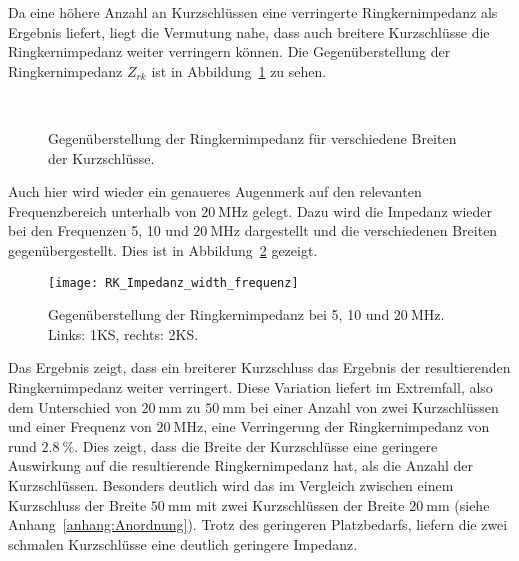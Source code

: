 \newpage



Da eine h\"ohere Anzahl an Kurzschl\"ussen eine verringerte Ringkernimpedanz als Ergebnis liefert, liegt die Vermutung nahe, dass auch breitere Kurzschl\"usse die Ringkernimpedanz weiter verringern k\"onnen. Die Gegen\"uberstellung der Ringkernimpedanz $Z_{rk}$ ist in Abbildung~\ref{fig:ringcorewidth} zu sehen.

\begin{figure}[htb]
	\centering
	\\
	\caption{Gegen\"uberstellung der Ringkernimpedanz f\"ur verschiedene Breiten der Kurzschl\"usse.}
	\label{fig:ringcorewidth}
\end{figure}

Auch hier wird wieder ein genaueres Augenmerk auf den relevanten Frequenzbereich unterhalb von $\SI{20}{\mega\hertz}$ gelegt. Dazu wird die Impedanz wieder bei den Frequenzen 5, 10 und $\SI{20}{\mega\hertz}$ dargestellt und die verschiedenen Breiten gegen\"ubergestellt. Dies ist in Abbildung~\ref{fig:ringcorewidth20} gezeigt.



\newpage



\begin{figure}[h]
	\centering
	\texttt{[image: RK\_Impedanz\_width\_frequenz]}
	\caption{Gegen\"uberstellung der Ringkernimpedanz bei 5, 10 und $\SI{20}{\mega\hertz}$. Links: 1KS, rechts: 2KS.}
	\label{fig:ringcorewidth20}
\end{figure}

Das Ergebnis zeigt, dass ein breiterer Kurzschluss das Ergebnis der resultierenden Ringkernimpedanz weiter verringert. Diese Variation liefert im Extremfall, also dem Unterschied von $\SI{20}{\milli\meter}$ zu $\SI{50}{\milli\meter}$ bei einer Anzahl von zwei Kurzschl\"ussen und einer Frequenz von $\SI{20}{\mega\hertz}$, eine Verringerung der Ringkernimpedanz von rund $\SI{2,8}{\%}$. Dies zeigt, dass die Breite der Kurzschl\"usse eine geringere Auswirkung auf die resultierende Ringkernimpedanz hat, als die Anzahl der Kurzschl\"ussen. Besonders deutlich wird das im Vergleich zwischen einem Kurzschluss der Breite $\SI{50}{\milli\meter}$ mit zwei Kurzschl\"ussen der Breite $\SI{20}{\milli\meter}$ (siehe Anhang~\ref{anhang:Anordnung}). Trotz des geringeren Platzbedarfs, liefern die zwei schmalen Kurzschl\"usse eine deutlich geringere Impedanz.


